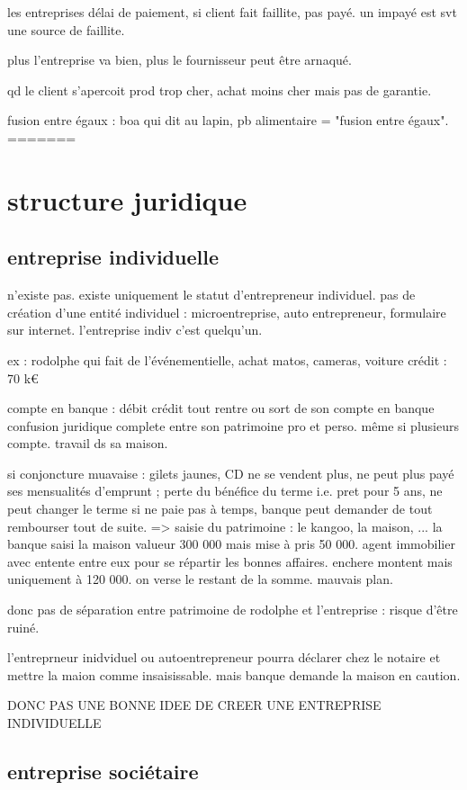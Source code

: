\documentclass[a4paper,12pt]{article}
\begin{document}
les entreprises délai de paiement, si client fait faillite, pas payé.
un impayé est svt une source de faillite.

plus l'entreprise va bien, plus le fournisseur peut être arnaqué.

qd le client s'apercoit prod trop cher, achat moins cher mais pas de garantie.


fusion entre égaux : boa qui dit au lapin, pb alimentaire = "fusion entre égaux".
=======
\section{structure juridique}
\subsection{ entreprise individuelle}
 n'existe pas. existe uniquement le statut d'entrepreneur individuel.
pas de création d'une entité individuel : microentreprise, auto entrepreneur, formulaire sur internet.
l'entreprise indiv c'est quelqu'un.

ex : rodolphe qui fait de l'événementielle, achat matos, cameras, voiture
crédit : 70 k€

compte en banque : débit crédit tout rentre ou sort de son compte en banque
confusion juridique complete entre son patrimoine pro et perso. même si plusieurs compte.
travail ds sa maison.

si conjoncture muavaise : gilets jaunes, CD ne se vendent plus, ne peut plus payé
ses mensualités d'emprunt ; perte du bénéfice du terme i.e. pret pour 5 ans, ne peut changer le terme
si ne paie pas à temps, banque peut demander de tout rembourser tout de suite.
=> saisie du patrimoine : le kangoo, la maison, ...
la banque saisi la maison valueur 300 000 mais mise à pris 50 000. agent immobilier avec entente entre eux pour se répartir les bonnes affaires. enchere montent mais uniquement à 120 000. on verse le restant de la somme.
mauvais plan.

donc pas de séparation entre patrimoine de rodolphe et l'entreprise : risque d'être ruiné.

l'entreprneur inidviduel ou autoentrepreneur pourra déclarer chez le notaire et mettre la maion
comme insaisissable.
mais banque demande la maison en caution.

DONC PAS UNE BONNE IDEE DE CREER UNE ENTREPRISE INDIVIDUELLE
\subsection{entreprise sociétaire}
\end{document}
